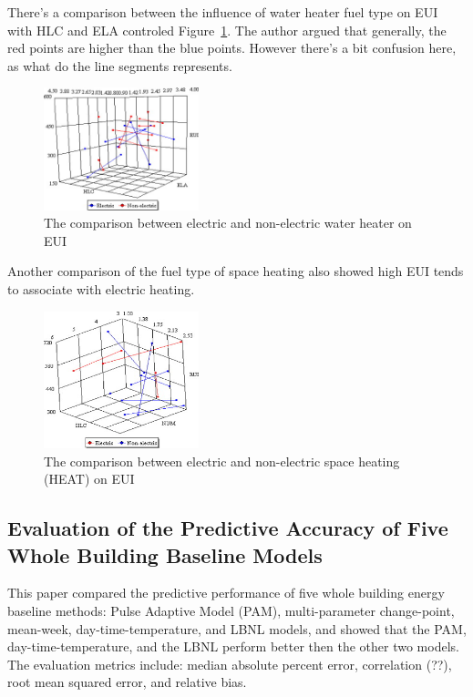 \documentclass[12pt]{article}
\newcommand{\fref}[1]{Figure~\ref{#1}}
\begin{document}
There's a comparison between the influence of water heater fuel type
on EUI with HLC and ELA controled \fref{fig:cmpHWS}. The author argued
that generally, the red points are higher than the blue
points. However there's a bit confusion here, as what do the line
segments represents. 
\begin{figure}[h!]
  \centering
  \includegraphics[width=0.4\textwidth]{images/cmpHWS.jpg}
  \caption{The comparison between electric and non-electric water heater on EUI~\cite{Yu20101637}}
  \label{fig:cmpHWS}
\end{figure}
\FloatBarrier Another comparison of the fuel type of space heating
also showed high EUI tends to associate with electric heating.
\begin{figure}[h!]
  \centering
  \includegraphics[width=0.4\textwidth]{images/cmpSpace.jpg}
  \caption{The comparison between electric and non-electric space heating (HEAT) on EUI~\cite{Yu20101637}}
  \label{fig:cmpSpace}
\end{figure}
\FloatBarrier 

\subsection{Evaluation of the Predictive Accuracy of Five Whole
  Building Baseline Models~\cite{granderson2014evaluation}}
This paper compared the predictive performance of five whole building
energy baseline methods: Pulse Adaptive Model (PAM), multi-parameter
change-point, mean-week, day-time-temperature, and LBNL models, and
showed that the PAM, day-time-temperature, and the LBNL perform better
then the other two models. The evaluation metrics include: median
absolute percent error, correlation (??), root mean squared error, and
relative bias.
\end{document}
